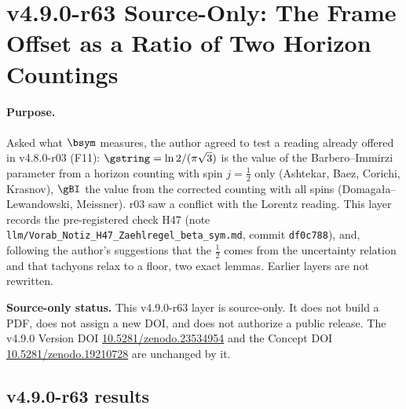 \clearpage
\section*{v4.9.0-r63 Source-Only: The Frame Offset as a Ratio of Two Horizon Countings}
\label{sec:v490-r63-counting}

\paragraph{Purpose.}
Asked what \(\bsym\) measures, the author agreed to test a reading already offered in v4.8.0-r03 (F11): \(\gstring=\ln2/(\pi\sqrt3)\) is the value of the
Barbero--Immirzi parameter from a horizon counting with spin \(j=\tfrac12\) only (Ashtekar, Baez, Corichi, Krasnov), \(\gBI\) the value from the corrected counting with
all spins (Domagała--Lewandowski, Meissner).  r03 saw a conflict with the Lorentz reading.  This layer records the pre-registered check H47 (note
\texttt{llm/Vorab\_Notiz\_H47\_Zaehlregel\_beta\_sym.md}, commit \texttt{df0c788}), and, following the author's suggestions that the \(\tfrac12\) comes from the uncertainty
relation and that tachyons relax to a floor, two exact lemmas.  Earlier layers are not rewritten.

\noindent\textbf{Source-only status.}
This v4.9.0-r63 layer is source-only.  It does not build a PDF, does not assign a new DOI,
and does not authorize a public release.  The v4.9.0 Version DOI
\href{https://doi.org/10.5281/zenodo.23534954}{10.5281/zenodo.23534954} and the Concept DOI
\href{https://doi.org/10.5281/zenodo.19210728}{10.5281/zenodo.19210728} are unchanged by it.

\subsection*{v4.9.0-r63 results}
\label{subsec:v490-r63-results}


